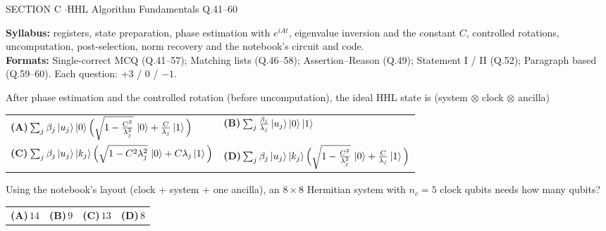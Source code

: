 \documentclass[11pt,a4paper]{article}
\newcommand{\optlabel}[1]{\textbf{(#1)}}
\newenvironment{qitem}[1]{\begin{list}{}{\setlength{\leftmargin}{3.3em}\setlength{\labelwidth}{3.1em}%
  \setlength{\labelsep}{0.2em}\setlength{\topsep}{3pt}\setlength{\parsep}{3pt}}\item[\textbf{Q.#1}\hfill]}{\end{list}}
\newcommand{\qsep}{\par\vspace{2pt}{\color{black!15}\hrule}\vspace{4pt}}
\begin{document}
\begin{sectionbanner}SECTION C \enspace$\cdot$\enspace HHL Algorithm Fundamentals \hfill Q.41--60\end{sectionbanner}

{\small \textbf{Syllabus:} registers, state preparation, phase estimation with $e^{iAt}$, eigenvalue inversion and the constant $C$, controlled rotations, uncomputation, post-selection, norm recovery and the notebook's circuit and code.\\ \textbf{Formats:} Single-correct MCQ (Q.41--57); Matching lists (Q.46--58); Assertion--Reason (Q.49); Statement I / II (Q.52); Paragraph based (Q.59--60). Each question: $+3$ / $0$ / $-1$.}
\par\medskip

\begin{qitem}{41}
After phase estimation and the controlled rotation (before uncomputation), the ideal HHL state is (system $\otimes$ clock $\otimes$ ancilla)
\par\smallskip\noindent\begin{tabularx}{\linewidth}{@{}*{2}{L}@{}}
\optlabel{A}\,$\sum_j\beta_j\ket{u_j}\ket{0}\Big(\sqrt{1 - \tfrac{C^2}{\lambda_j^2}}\,\ket0 + \tfrac{C}{\lambda_j}\ket1\Big)$ & \optlabel{B}\,$\sum_j\tfrac{\beta_j}{\lambda_j}\ket{u_j}\ket0\ket1$ \\[3pt]
\optlabel{C}\,$\sum_j\beta_j\ket{u_j}\ket{k_j}\Big(\sqrt{1 - C^2\lambda_j^2}\,\ket0 + C\lambda_j\ket1\Big)$ & \optlabel{D}\,$\sum_j\beta_j\ket{u_j}\ket{k_j}\Big(\sqrt{1 - \tfrac{C^2}{\lambda_j^2}}\,\ket0 + \tfrac{C}{\lambda_j}\ket1\Big)$
\end{tabularx}
\end{qitem}
\qsep

\begin{qitem}{42}
Using the notebook's layout (clock + system + one ancilla), an $8\times8$ Hermitian system with $n_c = 5$ clock qubits needs how many qubits?
\par\smallskip\noindent\begin{tabularx}{\linewidth}{@{}*{4}{L}@{}}
\optlabel{A}\,$14$ & \optlabel{B}\,$9$ & \optlabel{C}\,$13$ & \optlabel{D}\,$8$
\end{tabularx}
\end{qitem}
\qsep
\end{document}
